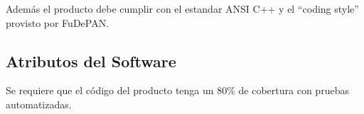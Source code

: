 \documentclass[10pt,a4paper]{article}
\begin{document}
    Adem\'as el producto debe cumplir con el estandar ANSI C++ y el ``coding style'' provisto por FuDePAN.

  \subsection{Atributos del Software}
    Se requiere que el c\'odigo del producto tenga un 80\% de cobertura con pruebas automatizadas.

\pagebreak

\begin{appendices} 
  
       
\end{appendices}
\end{document}
